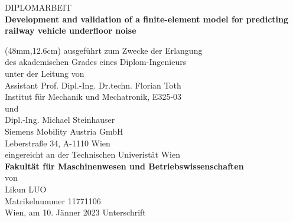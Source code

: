 \vspace{2.8cm}
\hspace{17mm}
\begin{minipage}{14cm} 
	{\LARGE DIPLOMARBEIT} \\[12mm]
	\doublespacing\textbf{\LARGE Development and validation of a finite-element model for predicting railway vehicle underfloor noise}
\end{minipage}

	{\fontsize{12}{1} \selectfont
\begin{textblock*}{14cm}(48mm,12.6cm)
	\noindent
	ausgeführt zum Zwecke der Erlangung \\[2.5mm]
	des akademischen Grades eines Diplom-Ingenieurs \\[2.5mm]
	unter der Leitung von \\[8mm]
	Assistant Prof. Dipl.-Ing. Dr.techn. Florian Toth \\[2.5mm]
	Institut für Mechanik und Mechatronik, E325-03 \\[8mm]
    und \\[8mm]
    Dipl.-Ing. Michael Steinhauser \\[2.5mm]
    Siemens Mobility Austria GmbH \\[2.5mm]
    Leberstraße 34, A-1110 Wien \\[8mm]
	eingereicht an der Technischen Univeristät Wien \\[2.5mm]
	\textbf{Fakultät für Maschinenwesen und Betriebswissenschaften} \\[4mm]
	von \\[20mm]
	Likun LUO \\[2.5mm]
	Matrikelnummer 11771106 \\[2.5mm]
	Wien, am 10. Jänner 2023 \hspace{50mm} Unterschrift\\[25mm]
\end{textblock*}}